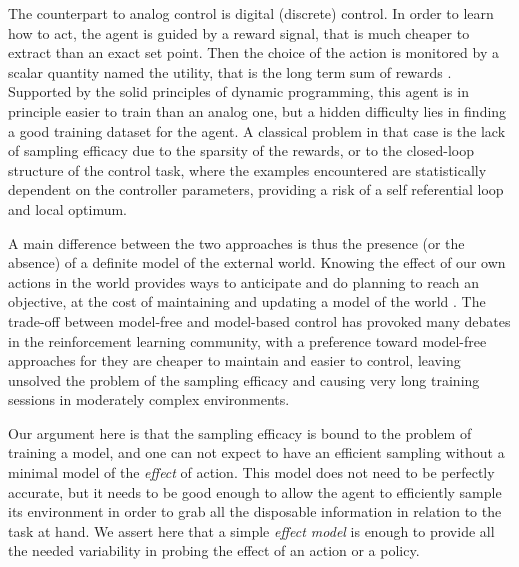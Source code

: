 \documentclass[runningheads]{llncs}
\begin{document}
The counterpart to analog control is digital (discrete) control.
In order to learn how to act, the agent is guided by a reward signal, that is much cheaper to extract than an exact set point.
Then the choice of the action is monitored by a scalar quantity named the utility, that is the long term sum of rewards \cite{sutton2018reinforcement}.
Supported by the solid principles of dynamic programming, this agent is in principle easier to train than an analog one, but
a hidden difficulty lies in finding a good training dataset for the agent. A classical problem in that case is the lack of sampling efficacy due to the sparsity of the rewards, or to the closed-loop structure of the control task, where the examples encountered are statistically dependent on the controller parameters, 
providing a risk of a self referential loop and local optimum.

A main difference between the two approaches is thus the presence (or the absence) of a definite model of the external world. Knowing the effect of our own actions in the world provides ways to anticipate and do planning to reach an objective, at the cost of maintaining and updating a model of the world \cite{kurutach2018model}. 
The trade-off between model-free and model-based control has provoked many debates in the reinforcement learning community, with a preference toward model-free approaches for they are cheaper to maintain and easier to control, leaving unsolved the problem of the sampling efficacy and causing very long training sessions in moderately complex environments.
 
Our argument here is that the sampling efficacy is bound to the problem of training a model, and one can not expect to have an efficient sampling without a minimal model of the \emph{effect} of action. This model does not need to be perfectly accurate, but it needs to be good enough to allow the agent to efficiently sample its environment in order to grab all the disposable information in relation to the task at hand. We assert here that a simple \emph{effect model} is enough to provide all the needed variability in probing the effect of an action or a policy. 
\end{document}
